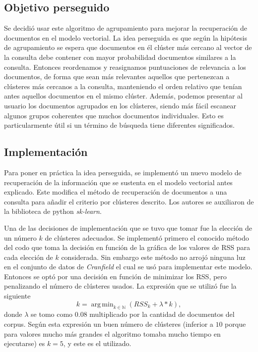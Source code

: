 \documentclass{llncs}
\DeclareMathOperator*{\argmin}{arg\,min}
\begin{document}
	\subsection{Objetivo perseguido}
	
	Se decidi\'o usar este algoritmo de agrupamiento para mejorar la recuperaci\'on de documentos en el modelo vectorial. La idea perseguida es que seg\'un la hip\'otesis de agrupamiento se espera que documentos en \'el cl\'uster m\'as cercano al vector de la consulta debe contener con mayor probabilidad documentos similares a la consulta. Entonces reordenamos y reasignamos puntuaciones de relevancia a los documentos, de forma que sean m\'as relevantes aquellos que pertenezcan a cl\'usteres m\'as cercanos a la consulta, manteniendo el orden relativo que ten\'ian antes aquellos documentos en el mismo cl\'uster. Adem\'as, podemos presentar al usuario los documentos agrupados en los cl\'usteres, siendo m\'as f\'acil escanear algunos grupos
	coherentes que muchos documentos individuales. Esto es particularmente \'util
	si un t\'ermino de b\'usqueda tiene diferentes significados.
	 
	\subsection{Implementaci\'on}
	Para poner en pr\'actica la idea perseguida, se implement\'o un nuevo modelo de recuperaci\'on de la informaci\'on que se sustenta en el modelo vectorial antes explicado. Este modifica el m\'etodo de recuperaci\'on de documentos a una consulta para a\~nadir el criterio por cl\'usteres descrito. Los autores se auxiliaron de la biblioteca de python \emph{sk-learn}.

	 Una de las decisiones de implementaci\'on que se tuvo que tomar fue la elecci\'on de un n\'umero $k$ de cl\'usteres adecuados. Se implement\'o primero el conocido m\'etodo del codo que toma la decisi\'on en funci\'on de la gr\'afica de los valores de RSS para cada elecci\'on de $k$ considerada. Sin embargo este m\'etodo no arroj\'o ninguna luz en el conjunto de datos de \emph{Cranfield} el cual se us\'o para implementar este modelo. Entonces se opt\'o por una decisi\'on en funci\'on de minimizar los RSS, pero penalizando el n\'umero de cl\'usteres usados. La expresi\'on que se utiliz\'o fue la siguiente
	 \[
		k = \argmin_{k \in \mathbb{N}} (RSS_k + \lambda * k),
	 \]
	 donde $\lambda$ se tomo como $0.08$ multiplicado por la cantidad de documentos del corpus. Seg\'un esta expresi\'on un buen n\'umero de cl\'usteres (inferior a $10$ porque para valores mucho m\'as grandes el algoritmo tomaba mucho tiempo en ejecutarse) es $k=5$, y este es el utilizado.
	 
\end{document}
